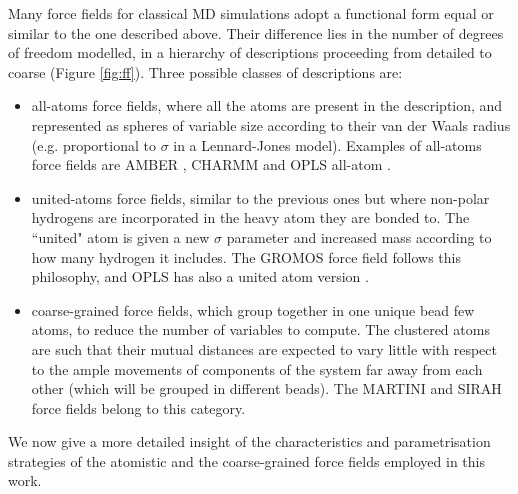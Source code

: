 Many force fields for classical MD simulations adopt a functional form equal or similar to the one described above. Their difference lies in the number of degrees of freedom modelled, in a hierarchy of descriptions proceeding from detailed to coarse (Figure \ref{fig:ff}). Three possible classes of descriptions are:
\begin{itemize}
\item all-atoms force fields, where all the atoms are present in the description, and represented as spheres of variable size according to their van der Waals radius (e.g. proportional to $\sigma$ in a Lennard-Jones model). Examples of all-atoms force fields are AMBER \citep{Maier2015,Dickson2014,Wang2004_amber}, CHARMM \citep{MacKerell1998,Klauda2010,Huang2013} and OPLS all-atom \citep{Jorgensen1988}.
\item united-atoms force fields, similar to the previous ones but where non-polar hydrogens are incorporated in the heavy atom they are bonded to. The ``united" atom is given a new $\sigma$ parameter and increased mass according to how many hydrogen it includes. The GROMOS force field \citep{Oostenbrink2004,Schmid2011} follows this philosophy, and OPLS has also a united atom version \citep{Jorgensen1996}.
\item coarse-grained force fields, which group together in one unique bead few atoms, to reduce the number of variables to compute. The clustered atoms are such that their mutual distances are expected to vary little with respect to the ample movements of components of the system far away from each other (which will be grouped in different beads). The MARTINI \citep{Marrink2007,Monticelli2008,DeJong2013} and SIRAH \citep{Machado2018,Barrera2019} force fields belong to this category.
\end{itemize}
%
We now give a more detailed insight of the characteristics and parametrisation strategies of the atomistic and the coarse-grained force fields employed in this work.


